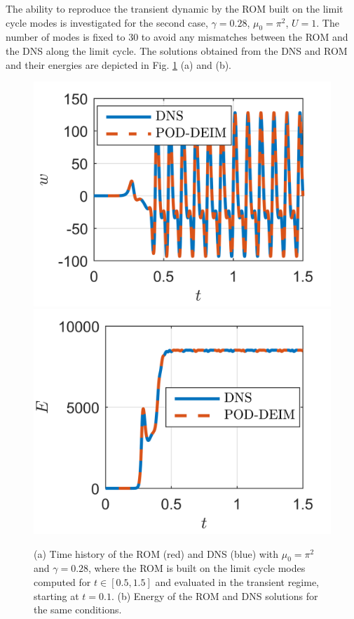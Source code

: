 \documentclass[11pt]{article}
\begin{document}
The ability to reproduce the transient dynamic by the ROM built on the limit cycle modes is investigated for the second case, $\gamma=0.28$, $\mu_0=\pi^2$, $U=1$. The number of modes is fixed to 30 to avoid any mismatches between the ROM and the DNS along the limit cycle. The solutions obtained from the DNS and ROM and their energies are depicted in Fig. \ref{fig:Energyparallel} (a) and (b). 
\begin{figure}
    \centering
    \includegraphics{TimeEvoparallel}
    \hfill
    \includegraphics{Energy3}
    \caption{%
    	    (a) Time history of the ROM (red) and DNS (blue) with $\mu_0 = \pi^2$ and $\gamma = 0.28$, where the ROM is built on the limit cycle modes computed for $t\in [0.5, 1.5]$ and evaluated in the transient regime, starting at $t=0.1$.
        (b) Energy of the ROM and DNS solutions for the same conditions.
    }
    \label{fig:Energyparallel}
\end{figure}
\end{document}
